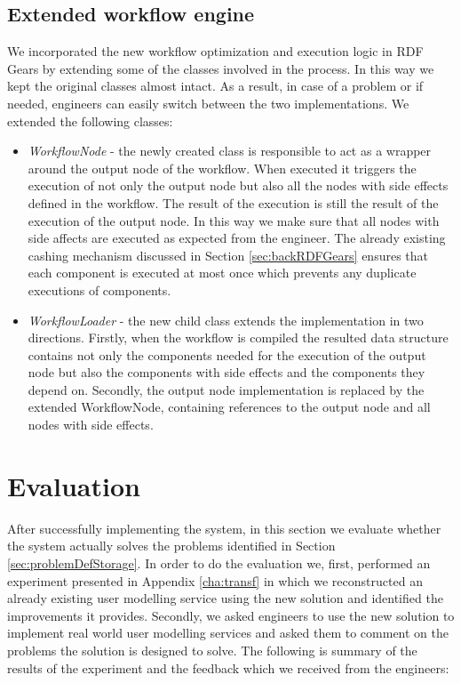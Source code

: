 \subsection{Extended workflow engine}

We incorporated the new workflow optimization and execution logic in RDF Gears by extending some of the classes involved in the process. In this way we kept the original classes almost intact. As a result, in case of a problem or if needed, engineers can easily switch between the two implementations. We extended the following classes:

\begin{itemize}
	\item \textit{WorkflowNode} - the newly created class is responsible to act as a wrapper around the output node of the workflow. When executed it triggers the execution of not only the output node but also all the nodes with side effects defined in the workflow. The result of the execution is still the result of the execution of the output node. In this way we make sure that all nodes with side affects are executed as expected from the engineer. The already existing cashing mechanism discussed in Section \ref{sec:backRDFGears} ensures that each component is executed at most once which prevents any duplicate executions of components.
	
	\item \textit{WorkflowLoader} - the new child class extends the implementation in two directions. Firstly, when the workflow is compiled the resulted data structure contains not only the components needed for the execution of the output node but also the components with side effects and the components they depend on. Secondly, the output node implementation is replaced by the extended WorkflowNode, containing references to the output node and all nodes with side effects.
\end{itemize}


\section{Evaluation} 
\label{sec:evalStorage}

After successfully implementing the system, in this section we evaluate whether the system actually solves the problems identified in Section \ref{sec:problemDefStorage}. In order to do the evaluation we, first, performed an experiment presented in Appendix \ref{cha:transf} in which we reconstructed an already existing user modelling service using the new solution and identified the improvements it provides. Secondly, we asked engineers to use the new solution to implement real world user modelling services and asked them to comment on the problems the solution is designed to solve. The following is summary of the results of the experiment and the feedback which we received from the engineers:

